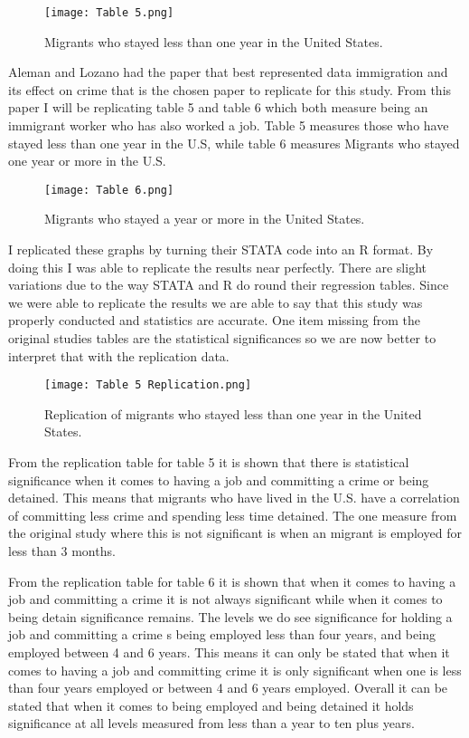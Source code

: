 \documentclass[12pt,letterpaper]{article}
\begin{document}
 \begin{figure}[ht]
    \centering
    \texttt{[image: Table 5.png]}
     \caption{Migrants who stayed less than one year in the United States. \citep{O_G}}
     \label{fig:5l}
\end{figure}

    \indent Aleman and  Lozano had the paper that best represented data immigration and its effect on crime that is the chosen paper to replicate for this study. From this paper I will be replicating table 5 and table 6 which both measure being an immigrant worker who has also worked a job. Table 5 measures those who have stayed less than one year in the U.S, while table 6 measures Migrants who stayed one year or more in the U.S.
   
\begin{figure}[ht]
    \centering
    \texttt{[image: Table 6.png]}
    \caption{Migrants who stayed a year or more in the United States.\citep{O_G} }
    \label{fig:6l}
\end{figure}

    \indent I replicated these graphs by turning their STATA code into an R format. By doing this I was able to replicate the results near perfectly. There are slight variations due to the way STATA and R do round their regression tables. Since we were able to replicate the results we are able to say that this study was properly conducted and statistics are accurate. One item missing from the original studies tables are the statistical significances so we are now better to interpret that with the replication data.
  
\begin{figure}[ht]
    \centering
    \texttt{[image: Table 5 Replication.png]}
    \caption{Replication of migrants who stayed less than one year in the United States. \citep{O_G}}
    \label{fig:Table 5 Replication}
\end{figure}

    \indent From the replication table for table 5 it is shown that there is statistical significance when it comes to having a job and committing a crime or being detained. This means that migrants who have lived in the U.S. have a correlation of committing less crime and spending less time detained. The one measure from the original study where this is not significant is when an migrant is employed for less than 3 months.
    

    \indent From the replication table for table 6 it is shown that when it comes to having a job and committing a crime it is not always significant while when it comes to being detain significance remains. The levels we do see significance for holding a job and committing a crime s being employed less than four years, and being employed between 4 and 6 years. This means it can only be stated that when it comes to having a job and committing crime it is only significant when one is less than four years employed or between 4 and 6 years employed. Overall it can be stated that when it comes to being employed and being detained it holds significance at all levels measured from less than a year to ten plus years.
    
\end{document}
